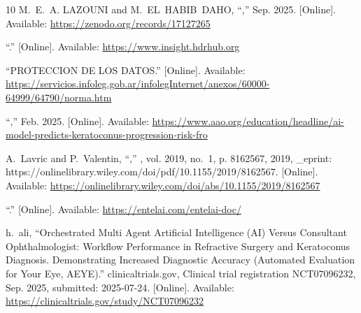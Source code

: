 \begin{thebibliography}{10}
\BIBentryALTinterwordspacing
M.~E.~A. LAZOUNI and M.~EL~HABIB~DAHO, ``,'' Sep. 2025. [Online].
  Available: \url{https://zenodo.org/records/17127265}
\BIBentrySTDinterwordspacing

\BIBentryALTinterwordspacing
``.'' [Online]. Available:
  \url{https://www.insight.hdrhub.org}
\BIBentrySTDinterwordspacing

\BIBentryALTinterwordspacing
``{PROTECCION} {DE} {LOS} {DATOS}.'' [Online]. Available:
  \url{https://servicios.infoleg.gob.ar/infolegInternet/anexos/60000-64999/64790/norma.htm}
\BIBentrySTDinterwordspacing

\BIBentryALTinterwordspacing
``,'' Feb. 2025. [Online]. Available:
  \url{https://www.aao.org/education/headline/ai-model-predicts-keratoconus-progression-risk-fro}
\BIBentrySTDinterwordspacing

\BIBentryALTinterwordspacing
A.~Lavric and P.~Valentin, ``,'' \emph{}, vol. 2019, no.~1, p. 8162567, 2019, \_eprint:
  https://onlinelibrary.wiley.com/doi/pdf/10.1155/2019/8162567. [Online].
  Available: \url{https://onlinelibrary.wiley.com/doi/abs/10.1155/2019/8162567}
\BIBentrySTDinterwordspacing

\BIBentryALTinterwordspacing
``.'' [Online]. Available:
  \url{https://entelai.com/entelai-doc/}
\BIBentrySTDinterwordspacing

\BIBentryALTinterwordspacing
h.~ali, ``Orchestrated {Multi} {Agent} {Artificial} {Intelligence} ({AI})
  {Versus} {Consultant} {Ophthalmologist}: {Workflow} {Performance} in
  {Refractive} {Surgery} and {Keratoconus} {Diagnosis}. {Demonstrating}
  {Increased} {Diagnostic} {Accuracy} ({Automated} {Evaluation} for {Your}
  {Eye}, {AEYE}).'' clinicaltrials.gov, Clinical trial registration
  NCT07096232, Sep. 2025, submitted: 2025-07-24. [Online]. Available:
  \url{https://clinicaltrials.gov/study/NCT07096232}
\BIBentrySTDinterwordspacing


\end{thebibliography}
